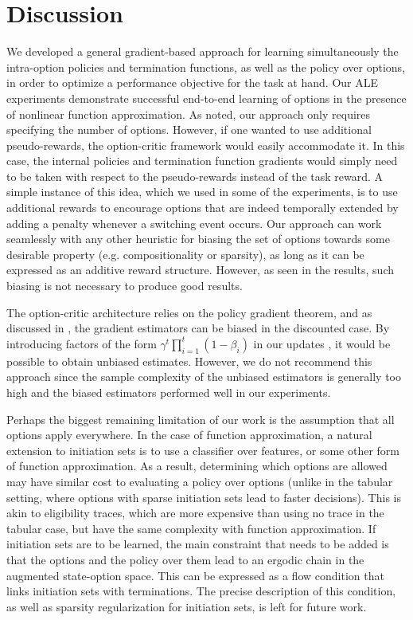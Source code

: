 \documentclass[letterpaper]{article}
\begin{document}
\section{Discussion}\label{sect:discussion}

We developed a general gradient-based approach for learning simultaneously the
intra-option policies and termination functions, as well as the policy over options,
in order to optimize a performance objective for the task at hand.
Our ALE experiments demonstrate successful
end-to-end learning of options in the presence of nonlinear function
approximation. As noted,  our approach only requires specifying
the number of options.
However, if one wanted to use additional
pseudo-rewards, the option-critic framework would easily accommodate it.
In this case, the internal policies and termination function gradients would simply need to be
taken with respect to the pseudo-rewards instead of the task reward.
A simple instance of this idea, which we used in some of the experiments, is to
use additional rewards to encourage options that are indeed temporally
extended by adding a penalty whenever a switching event
occurs. Our approach can work seamlessly with any other heuristic for biasing
the set of options towards some desirable property (e.g. compositionality or sparsity),
as long as it can be expressed as an additive reward structure.
However, as seen in the results, such biasing is not necessary
to produce good results.

The option-critic architecture relies on the policy gradient theorem, and as discussed in
 \cite{thomas2014bias}, the gradient estimators can be biased
in the discounted case. By introducing factors of the form
$\gamma^t  \prod_{i=1}^t(1-\beta_i)$ in our updates \cite[eq (3)]{thomas2014bias},
it would be possible to obtain unbiased estimates. However, we do not recommend
this approach since the sample complexity of the unbiased estimators is generally
too high and the biased estimators performed well in our experiments.

Perhaps the biggest remaining limitation of our work is the assumption that all
options apply everywhere.  In the case of function approximation, a natural
extension to initiation sets is to use a classifier over features, or some other
form of function approximation.  As a result, determining which options are
allowed may have similar cost to evaluating a policy over options
(unlike in the tabular setting, where options with sparse initiation sets lead to faster decisions).
This is akin to eligibility traces, which are more expensive than using no
trace in the tabular case, but have the same complexity with function approximation.
If initiation sets are to be learned, the main constraint that needs to be added
is that the options and the policy over them lead to an ergodic chain in the augmented
state-option space. This can be expressed as a flow condition that links
initiation sets with terminations. The precise description of this condition,
as well as sparsity regularization for initiation sets, is left for future work.
\end{document}
